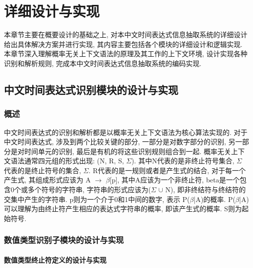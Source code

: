 
\chapter{详细设计与实现}

本章节主要在概要设计的基础之上, 对本中文时间表达式信息抽取系统的详细设计给出具体解决方案并进行实现, 其内容主要包括各个模块的详细设计和逻辑实现.
本章节深入理解概率无关上下文语法的原理及其工作的上下文环境, 设计实现各种识别和解析规则, 完成本中文时间表达式信息抽取系统的编码实现.


\section{中文时间表达式识别模块的设计与实现}

\subsection{概述}

中文时间表达式的识别和解析都是以概率无关上下文语法为核心算法实现的.
对于中文时间表达式, 涉及到两个比较关键的部分, 一部分是对数字部分的识别, 另一部分是对时间单元的识别, 最后是有机的将这些识别规则组合到一起.
概率无关上下文语法通常四元组的形式出现: (N, R, S,  $\varSigma$). 其中N代表的是非终止符号集合, $\varSigma$ 代表的是终止符号的集合, $\varSigma$.
R代表的是一规则或者是产生式的结合, 对于每一个产生式, 其组成形式应该为 A $\rightarrow$ $\beta$[p], 其中A应该为一个非终止符, beta是一个包含0个或多个符号的字符串,
字符串的形式应该为($\varSigma$ $\cup$ N), 即非终结符与终结符的交集中产生的字符串. p则为一个介于0和1中间的数字, 表示 P($\beta$|A)的概率.
P($\beta$|A)可以理解为由终止符产生相应的表达式字符串的概率, 即该产生式的概率.
S则为起始符号.


\subsection{数值类型识别子模块的设计与实现}

\subsubsection{数值类型终止符定义的设计与实现}

